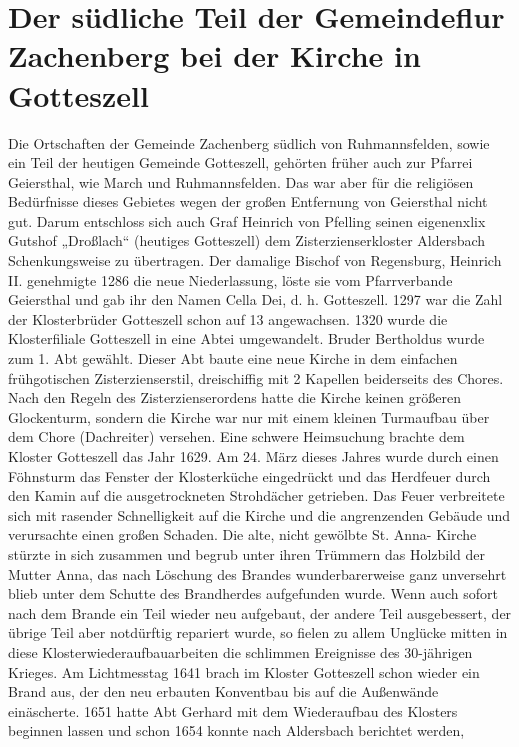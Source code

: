 \documentclass{book}
\begin{document}
\section{Der südliche Teil der Gemeindeflur Zachenberg bei der Kirche in
Gotteszell}

Die Ortschaften der Gemeinde Zachenberg südlich von Ruhmannsfelden,
sowie ein Teil der heutigen Gemeinde Gotteszell, gehörten früher auch
zur Pfarrei Geiersthal, wie March und Ruhmannsfelden. Das war aber für
die religiösen Bedürfnisse dieses Gebietes wegen der großen Entfernung
von Geiersthal nicht gut. Darum entschloss sich auch Graf Heinrich von
Pfelling seinen eigenenxlix Gutshof „Droßlach“ (heutiges Gotteszell) dem
Zisterzienserkloster Aldersbach Schenkungsweise zu übertragen. Der
damalige Bischof von Regensburg, Heinrich II. genehmigte 1286 die neue
Niederlassung, löste sie vom Pfarrverbande Geiersthal und gab ihr den
Namen Cella Dei, d. h. Gotteszell. 1297 war die Zahl der Klosterbrüder
Gotteszell schon auf 13 angewachsen. 1320 wurde die Klosterfiliale
Gotteszell in eine Abtei umgewandelt. Bruder Bertholdus wurde zum 1. Abt
gewählt. Dieser Abt baute eine neue Kirche in dem einfachen
frühgotischen Zisterzienserstil, dreischiffig mit 2 Kapellen beiderseits
des Chores. Nach den Regeln des Zisterzienserordens hatte die Kirche
keinen größeren Glockenturm, sondern die Kirche war nur mit einem
kleinen Turmaufbau über dem Chore (Dachreiter) versehen. Eine schwere
Heimsuchung brachte dem Kloster Gotteszell das Jahr 1629. Am 24. März
dieses Jahres wurde durch einen Föhnsturm das Fenster der Klosterküche
eingedrückt und das Herdfeuer durch den Kamin auf die ausgetrockneten
Strohdächer getrieben. Das Feuer verbreitete sich mit rasender
Schnelligkeit auf die Kirche und die angrenzenden Gebäude und
verursachte einen großen Schaden. Die alte, nicht gewölbte St. Anna-
Kirche stürzte in sich zusammen und begrub unter ihren Trümmern das
Holzbild der Mutter Anna, das nach Löschung des Brandes wunderbarerweise
ganz unversehrt blieb unter dem Schutte des Brandherdes aufgefunden
wurde. Wenn auch sofort nach dem Brande ein Teil wieder neu aufgebaut,
der andere Teil ausgebessert, der übrige Teil aber notdürftig repariert
wurde, so fielen zu allem Unglücke mitten in diese
Klosterwiederaufbauarbeiten die schlimmen Ereignisse des 30-jährigen
Krieges. Am Lichtmesstag 1641 brach im Kloster Gotteszell schon wieder
ein Brand aus, der den neu erbauten Konventbau bis auf die Außenwände
einäscherte. 1651 hatte Abt Gerhard mit dem Wiederaufbau des Klosters
beginnen lassen und schon 1654 konnte nach Aldersbach berichtet werden,
\end{document}
